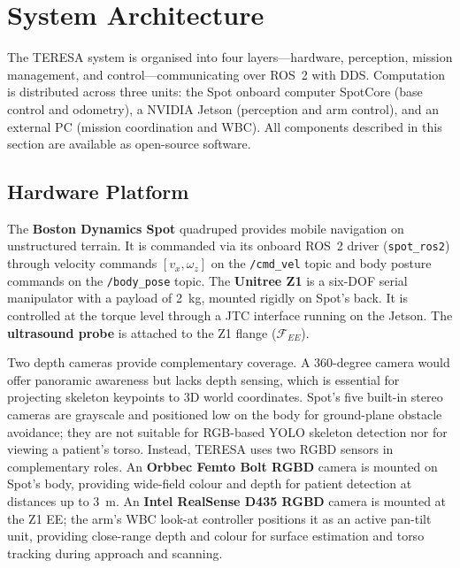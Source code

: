 \section{System Architecture}
\label{sec:system_architecture}

The \ac{TERESA} system is organised into four layers---hardware, perception,
mission management, and control---communicating over \ac{ROS}~2 with
\ac{DDS}. Computation is distributed across three units: the Spot onboard
computer SpotCore (base control and odometry), a NVIDIA Jetson (perception
and arm control), and an external PC (mission coordination and \ac{WBC}).
All components described in this section are available as open-source
software.

\subsection{Hardware Platform}

The \textbf{Boston Dynamics Spot} quadruped provides mobile navigation on
unstructured terrain. It is commanded via its onboard \ac{ROS}~2 driver
(\texttt{spot\_ros2}) through velocity commands $[v_x, \omega_z]$ on the
\texttt{/cmd\_vel} topic and body posture commands on the
\texttt{/body\_pose} topic. The \textbf{Unitree Z1} is a six-\ac{DOF}
serial manipulator with a payload of \SI{2}{\kilogram}, mounted rigidly on
Spot's back. It is controlled at the torque level through a \ac{JTC}
interface running on the Jetson. The \textbf{ultrasound probe} is attached
to the Z1 flange ($\mathcal{F}_{EE}$).

Two depth cameras provide complementary coverage. A 360-degree camera
would offer panoramic awareness but lacks depth sensing, which is essential
for projecting skeleton keypoints to 3D world coordinates. Spot's five
built-in stereo cameras are grayscale and positioned low on the body for
ground-plane obstacle avoidance; they are not suitable for RGB-based
\ac{YOLO} skeleton detection nor for viewing a patient's torso. Instead,
\ac{TERESA} uses two \ac{RGBD} sensors in complementary roles. An
\textbf{Orbbec Femto Bolt \ac{RGBD}} camera is mounted on Spot's body,
providing wide-field colour and depth for patient detection at distances up
to \SI{3}{\metre}. An \textbf{Intel RealSense D435 \ac{RGBD}} camera is
mounted at the Z1 \ac{EE}; the arm's \ac{WBC} look-at controller positions it
as an active pan-tilt unit, providing close-range depth and colour for
surface estimation and torso tracking during approach and scanning.

